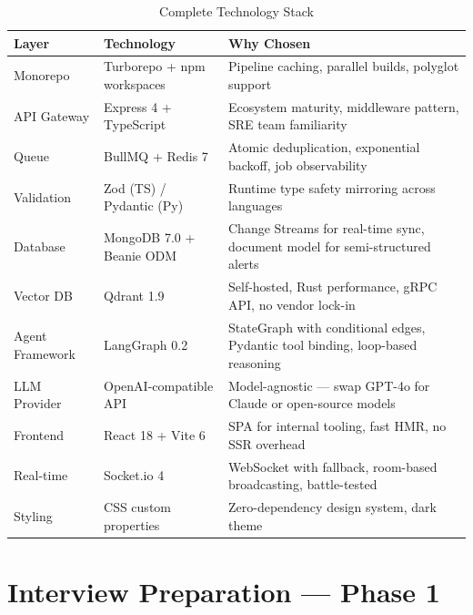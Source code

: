 \documentclass[11pt,a4paper]{article}
\begin{document}
\begin{table}[h!]
\centering
\caption{Complete Technology Stack}
\renewcommand{\arraystretch}{1.3}
\begin{tabular}{p{3.5cm} p{4cm} p{5cm}}
\toprule
\textbf{Layer} & \textbf{Technology} & \textbf{Why Chosen} \\
\midrule
Monorepo & Turborepo + npm workspaces & Pipeline caching, parallel builds, polyglot support \\
API Gateway & Express 4 + TypeScript & Ecosystem maturity, middleware pattern, SRE team familiarity \\
Queue & BullMQ + Redis 7 & Atomic deduplication, exponential backoff, job observability \\
Validation & Zod (TS) / Pydantic (Py) & Runtime type safety mirroring across languages \\
Database & MongoDB 7.0 + Beanie ODM & Change Streams for real-time sync, document model for semi-structured alerts \\
Vector DB & Qdrant 1.9 & Self-hosted, Rust performance, gRPC API, no vendor lock-in \\
Agent Framework & LangGraph 0.2 & StateGraph with conditional edges, Pydantic tool binding, loop-based reasoning \\
LLM Provider & OpenAI-compatible API & Model-agnostic — swap GPT-4o for Claude or open-source models \\
Frontend & React 18 + Vite 6 & SPA for internal tooling, fast HMR, no SSR overhead \\
Real-time & Socket.io 4 & WebSocket with fallback, room-based broadcasting, battle-tested \\
Styling & CSS custom properties & Zero-dependency design system, dark theme \\
\bottomrule
\end{tabular}
\end{table}

\section{Interview Preparation — Phase 1}
\end{document}

